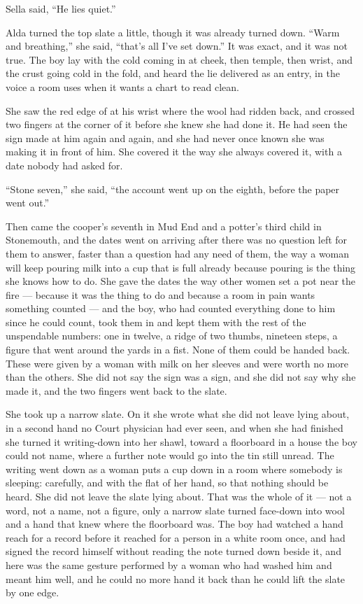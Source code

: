 Sella said, “He lies quiet.”

Alda turned the top slate a little, though it was already turned down. “Warm and breathing,” she said, “that's all I've set down.” It was exact, and it was not true. The boy lay with the cold coming in at cheek, then temple, then wrist, and the crust going cold in the fold, and heard the lie delivered as an entry, in the voice a room uses when it wants a chart to read clean.

She saw the red edge of  at his wrist where the wool had ridden back, and crossed two fingers at the corner of it before she knew she had done it. He had seen the sign made at him again and again, and she had never once known she was making it in front of him. She covered it the way she always covered it, with a date nobody had asked for.

“Stone seven,” she said, “the account went up on the eighth, before the paper went out.”

Then came the cooper's seventh in Mud End and a potter's third child in Stonemouth, and the dates went on arriving after there was no question left for them to answer, faster than a question had any need of them, the way a woman will keep pouring milk into a cup that is full already because pouring is the thing she knows how to do. She gave the dates the way other women set a pot near the fire --- because it was the thing to do and because a room in pain wants something counted --- and the boy, who had counted everything done to him since he could count, took them in and kept them with the rest of the unspendable numbers: one in twelve, a ridge of two thumbs, nineteen steps, a figure that went around the yards in a fist. None of them could be handed back. These were given by a woman with milk on her sleeves and were worth no more than the others. She did not say the sign was a sign, and she did not say why she made it, and the two fingers went back to the slate.

She took up a narrow slate. On it she wrote what she did not leave lying about, in a second hand no Court physician had ever seen, and when she had finished she turned it writing-down into her shawl, toward a floorboard in a house the boy could not name, where a further note would go into the tin still unread. The writing went down as a woman puts a cup down in a room where somebody is sleeping: carefully, and with the flat of her hand, so that nothing should be heard. She did not leave the slate lying about. That was the whole of it --- not a word, not a name, not a figure, only a narrow slate turned face-down into wool and a hand that knew where the floorboard was. The boy had watched a hand reach for a record before it reached for a person in a white room once, and had signed the record himself without reading the note turned down beside it, and here was the same gesture performed by a woman who had washed him and meant him well, and he could no more hand it back than he could lift the slate by one edge.

